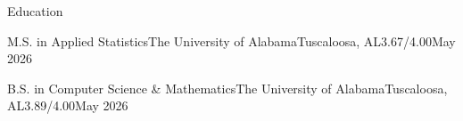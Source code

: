 \documentclass[
	10.5pt, %
]{resume} %
\begin{document}

\begin{rSection}{Education}


	
	
	
	\begin{rEducation}{M.S. in Applied Statistics}{The University of Alabama}{Tuscaloosa, AL}{3.67/4.00}{May 2026}
	\end{rEducation}
	
	\begin{rEducation}{B.S. in Computer Science \& Mathematics}{The University of Alabama}{Tuscaloosa, AL}{3.89/4.00}{May 2026}
	\end{rEducation}

	\vspace{0.25em}
	
\end{rSection}
\end{document}

